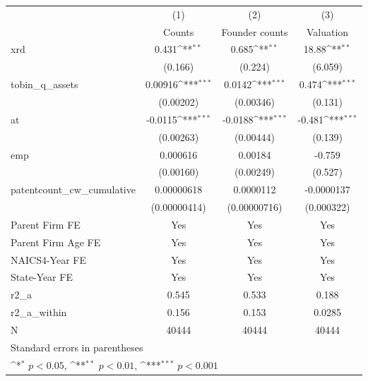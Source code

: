 {
\def\sym#1{\ifmmode^{#1}\else\(^{#1}\)\fi}
\begin{tabular}{l*{3}{c}}
\hline\hline
            &\multicolumn{1}{c}{(1)}&\multicolumn{1}{c}{(2)}&\multicolumn{1}{c}{(3)}\\
            &\multicolumn{1}{c}{Counts}&\multicolumn{1}{c}{Founder counts}&\multicolumn{1}{c}{Valuation}\\
\hline
xrd         &       0.431\sym{**} &       0.685\sym{**} &       18.88\sym{**} \\
            &     (0.166)         &     (0.224)         &     (6.059)         \\
[1em]
tobin\_q\_assets&     0.00916\sym{***}&      0.0142\sym{***}&       0.474\sym{***}\\
            &   (0.00202)         &   (0.00346)         &     (0.131)         \\
[1em]
at          &     -0.0115\sym{***}&     -0.0188\sym{***}&      -0.481\sym{***}\\
            &   (0.00263)         &   (0.00444)         &     (0.139)         \\
[1em]
emp         &    0.000616         &     0.00184         &      -0.759         \\
            &   (0.00160)         &   (0.00249)         &     (0.527)         \\
[1em]
patentcount\_cw\_cumulative&  0.00000618         &   0.0000112         &  -0.0000137         \\
            &(0.00000414)         &(0.00000716)         &  (0.000322)         \\
[1em]
Parent Firm FE&         Yes         &         Yes         &         Yes         \\
[1em]
Parent Firm Age FE&         Yes         &         Yes         &         Yes         \\
[1em]
NAICS4-Year FE&         Yes         &         Yes         &         Yes         \\
[1em]
State-Year FE&         Yes         &         Yes         &         Yes         \\
\hline
r2\_a        &       0.545         &       0.533         &       0.188         \\
r2\_a\_within &       0.156         &       0.153         &      0.0285         \\
N           &       40444         &       40444         &       40444         \\
\hline\hline
\multicolumn{4}{l}{\footnotesize Standard errors in parentheses}\\
\multicolumn{4}{l}{\footnotesize \sym{*} \(p<0.05\), \sym{**} \(p<0.01\), \sym{***} \(p<0.001\)}\\
\end{tabular}
}
